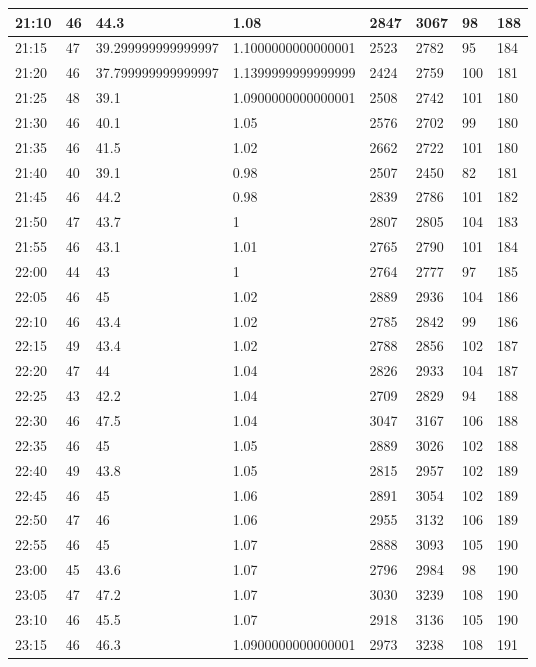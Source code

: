 \documentclass[
]{book}
\begin{document}
\begin{tabular}{l|l|l|l|l|l|l|l}
\hline
21:10 & 46 & 44.3 & 1.08 & 2847 & 3067 & 98 & 188\\
\hline
21:15 & 47 & 39.299999999999997 & 1.1000000000000001 & 2523 & 2782 & 95 & 184\\
\hline
21:20 & 46 & 37.799999999999997 & 1.1399999999999999 & 2424 & 2759 & 100 & 181\\
\hline
21:25 & 48 & 39.1 & 1.0900000000000001 & 2508 & 2742 & 101 & 180\\
\hline
21:30 & 46 & 40.1 & 1.05 & 2576 & 2702 & 99 & 180\\
\hline
21:35 & 46 & 41.5 & 1.02 & 2662 & 2722 & 101 & 180\\
\hline
21:40 & 40 & 39.1 & 0.98 & 2507 & 2450 & 82 & 181\\
\hline
21:45 & 46 & 44.2 & 0.98 & 2839 & 2786 & 101 & 182\\
\hline
21:50 & 47 & 43.7 & 1 & 2807 & 2805 & 104 & 183\\
\hline
21:55 & 46 & 43.1 & 1.01 & 2765 & 2790 & 101 & 184\\
\hline
22:00 & 44 & 43 & 1 & 2764 & 2777 & 97 & 185\\
\hline
22:05 & 46 & 45 & 1.02 & 2889 & 2936 & 104 & 186\\
\hline
22:10 & 46 & 43.4 & 1.02 & 2785 & 2842 & 99 & 186\\
\hline
22:15 & 49 & 43.4 & 1.02 & 2788 & 2856 & 102 & 187\\
\hline
22:20 & 47 & 44 & 1.04 & 2826 & 2933 & 104 & 187\\
\hline
22:25 & 43 & 42.2 & 1.04 & 2709 & 2829 & 94 & 188\\
\hline
22:30 & 46 & 47.5 & 1.04 & 3047 & 3167 & 106 & 188\\
\hline
22:35 & 46 & 45 & 1.05 & 2889 & 3026 & 102 & 188\\
\hline
22:40 & 49 & 43.8 & 1.05 & 2815 & 2957 & 102 & 189\\
\hline
22:45 & 46 & 45 & 1.06 & 2891 & 3054 & 102 & 189\\
\hline
22:50 & 47 & 46 & 1.06 & 2955 & 3132 & 106 & 189\\
\hline
22:55 & 46 & 45 & 1.07 & 2888 & 3093 & 105 & 190\\
\hline
23:00 & 45 & 43.6 & 1.07 & 2796 & 2984 & 98 & 190\\
\hline
23:05 & 47 & 47.2 & 1.07 & 3030 & 3239 & 108 & 190\\
\hline
23:10 & 46 & 45.5 & 1.07 & 2918 & 3136 & 105 & 190\\
\hline
23:15 & 46 & 46.3 & 1.0900000000000001 & 2973 & 3238 & 108 & 191\\

\end{tabular}
\end{document}
